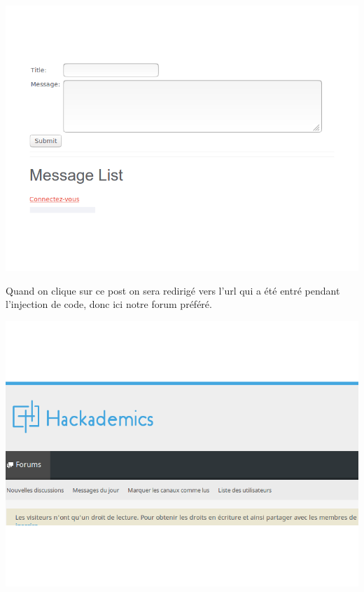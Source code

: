 \begin{center}
\includegraphics[scale=0.3]{Web/assets/xsst101.png}
\end{center}

\bigskip

\begin{flushleft}
Quand on clique sur ce post on sera redirigé vers l’url qui a été entré pendant l’injection de code, donc ici notre forum préféré.
\end{flushleft}

\begin{center}
\includegraphics[scale=0.3]{Web/assets/xssha.png}
\end{center}

